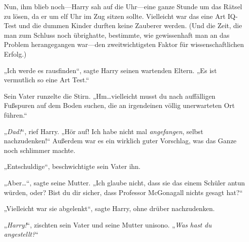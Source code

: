 Nun, ihm blieb noch—Harry sah auf die Uhr—eine ganze Stunde um das Rätsel zu lösen, da er um elf Uhr im Zug sitzen sollte. Vielleicht war das eine Art IQ-Test und die dummen Kinder durften keine Zauberer werden. (Und die Zeit, die man zum Schluss noch übrighatte, bestimmte, wie gewissenhaft man an das Problem herangegangen war—den zweitwichtigsten Faktor für wissenschaftlichen Erfolg.)

„Ich werde es rausfinden“, sagte Harry seinen wartenden Eltern. „Es ist vermutlich so eine Art Test.“

Sein Vater runzelte die Stirn. „Hm…vielleicht musst du nach auffälligen Fußspuren auf dem Boden suchen, die an irgendeinen völlig unerwarteten Ort führen.“

„\emph{Dad!}“, rief Harry. „Hör auf! Ich habe nicht mal \emph{angefangen}, selbst nachzudenken!“ Außerdem war es ein wirklich guter Vorschlag, was das Ganze noch schlimmer machte.

„Entschuldige“, beschwichtigte sein Vater ihn.

„Aber…“, sagte seine Mutter. „Ich glaube nicht, dass sie das einem Schüler antun würden, oder? Bist du dir sicher, dass Professor McGonagall nichts gesagt hat?“

„Vielleicht war sie abgelenkt“, sagte Harry, ohne drüber nachzudenken.

„\emph{Harry!}“, zischten sein Vater und seine Mutter unisono. „\emph{Was hast du angestellt?}“

